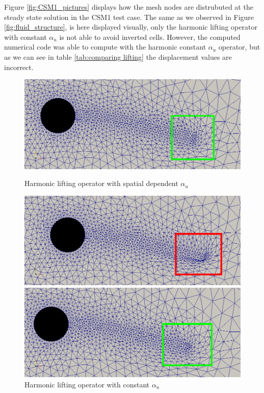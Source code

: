 Figure \ref{fig:CSM1_pictures} displays how the mesh nodes are distrubuted at the steady state solution in the CSM1 test case. The same as we observed in Figure \ref{fig:fluid_structure}, is here displayed visually, only the harmonic lifting operator with constant $\alpha_u$ is not able to avoid inverted cells. However, the computed numerical code was able to compute with the harmonic constant $\alpha_u$ operator, but as we can see in table \ref{tab:comparing lifting} the displacement values are incorrect.

\begin{figure}[H]  
  \begin{minipage}[b]{0.6\linewidth}
    \centering
    \includegraphics[scale=0.25]{./Mesh_motion_results/CSM1_laplace_rectangle.png} 
    \caption{Harmonic lifting operator with spatial dependent $\alpha_u$} 
    \vspace{4ex}
  \end{minipage}%
  \begin{minipage}[b]{0.6\linewidth}
    \centering
    \includegraphics[scale=0.25]{./Mesh_motion_results/CSM1_constant_rectangle.png} 
    \caption{Harmonic lifting operator with constant $\alpha_u$} 
    \vspace{4ex}
  \end{minipage} 
  \begin{minipage}[b]{0.6\linewidth}
    \centering
    \includegraphics[scale=0.25]{./Mesh_motion_results/CSM1_bibc1_rectangle.png} 

\end{minipage}
\end{figure}
